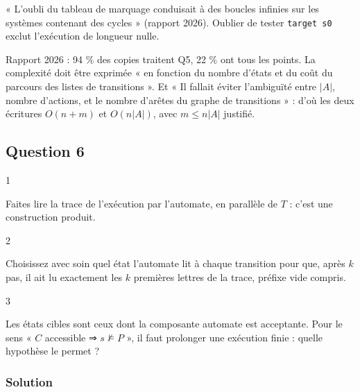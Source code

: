 \documentclass[11pt,a4paper]{article}
\begin{document}
\begin{piege}

« L'oubli du tableau de marquage conduisait à des boucles infinies sur les systèmes contenant des cycles » (rapport 2026). Oublier de tester \texttt{target\ s0} exclut l'exécution de longueur nulle.

\end{piege}

\begin{jury}

Rapport 2026 : 94 \% des copies traitent Q5, 22 \% ont tous les points. La complexité doit être exprimée « en fonction du nombre d'états et du coût du parcours des listes de transitions ». Et « Il fallait éviter l'ambiguïté entre \(|A|\), nombre d'actions, et le nombre d'arêtes du graphe de transitions » : d'où les deux écritures \(O(n+m)\) et \(O(n|A|)\), avec \(m\le n|A|\) justifié.

\end{jury}

\hypertarget{question-6}{%
\subsection{Question 6}\label{question-6}}

\begin{indication}{1}

Faites lire la trace de l'exécution par l'automate, en parallèle de \(T\) : c'est une construction produit.

\end{indication}

\begin{indication}{2}

Choisissez avec soin quel état l'automate lit à chaque transition pour que, après \(k\) pas, il ait lu exactement les \(k\) premières lettres de la trace, préfixe vide compris.

\end{indication}

\begin{indication}{3}

Les états cibles sont ceux dont la composante automate est acceptante. Pour le sens « \(C\) accessible ⇒ \(s\not\models P\) », il faut prolonger une exécution finie : quelle hypothèse le permet ?

\end{indication}

\hypertarget{solution-5}{%
\subsubsection{Solution}\label{solution-5}}
\end{document}
